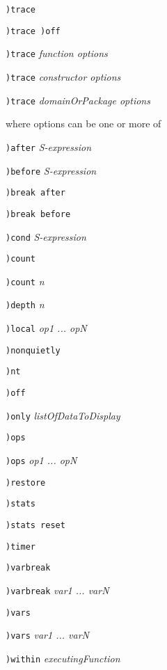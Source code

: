 {{{{{{{\par{}
\begin{simpleList}
\item{\tt )trace}
\item{\tt )trace )off}

\item{\tt )trace} {\it function \lanb{}options\ranb{}}
\item{\tt )trace} {\it constructor \lanb{}options\ranb{}}
\item{\tt )trace} {\it domainOrPackage \lanb{}options\ranb{}}
\end{simpleList}
%
where options can be one or more of
%
\begin{simpleList}
\item{\tt )after} {\it S-expression}
\item{\tt )before} {\it S-expression}
\item{\tt )break after}
\item{\tt )break before}
\item{\tt )cond} {\it S-expression}
\item{\tt )count}
\item{\tt )count} {\it n}
\item{\tt )depth} {\it n}
\item{\tt )local} {\it op1 \lanb{}... opN\ranb{}}
\item{\tt )nonquietly}
\item{\tt )nt}
\item{\tt )off}
\item{\tt )only} {\it listOfDataToDisplay}
\item{\tt )ops}
\item{\tt )ops} {\it op1 \lanb{}... opN \ranb{}}
\item{\tt )restore}
\item{\tt )stats}
\item{\tt )stats reset}
\item{\tt )timer}
\item{\tt )varbreak}
\item{\tt )varbreak} {\it var1 \lanb{}... varN \ranb{}}
\item{\tt )vars}
\item{\tt )vars} {\it var1 \lanb{}... varN \ranb{}}
\item{\tt )within} {\it executingFunction}
\end{simpleList}

\par{}

}}}}}}}
